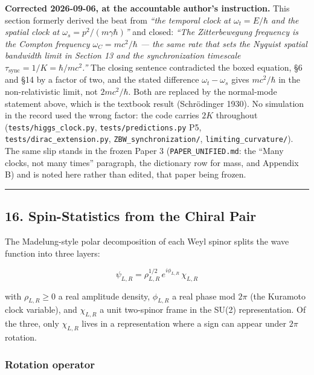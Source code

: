 \documentclass[
]{article}
\begin{document}
\textbf{Corrected 2026-09-06, at the accountable author's instruction.}
This section formerly derived the beat from \emph{``the temporal clock
at \(\omega_t = E/\hbar\) and the spatial clock at
\(\omega_s = p^2/(m\gamma\hbar)\)''} and closed: \emph{``The
Zitterbewegung frequency is the Compton frequency
\(\omega_C = mc^2/\hbar\) --- the same rate that sets the Nyquist
spatial bandwidth limit in Section 13 and the synchronization timescale
\(\tau_{\text{sync}} = 1/K = \hbar/mc^2\).''} The closing sentence
contradicted the boxed equation, §6 and §14 by a factor of two, and the
stated difference \(\omega_t - \omega_s\) gives \(mc^2/\hbar\) in the
non-relativistic limit, not \(2mc^2/\hbar\). Both are replaced by the
normal-mode statement above, which is the textbook result (Schrödinger
1930). No simulation in the record used the wrong factor: the code
carries \(2K\) throughout (\texttt{tests/higgs\_clock.py},
\texttt{tests/predictions.py} P5, \texttt{tests/dirac\_extension.py},
\texttt{ZBW\_synchronization/}, \texttt{limiting\_curvature/}). The same
slip stands in the frozen Paper 3 (\texttt{PAPER\_UNIFIED.md}: the
``Many clocks, not many times'' paragraph, the dictionary row for mass,
and Appendix B) and is noted here rather than edited, that paper being
frozen.

\begin{center}\rule{0.5\linewidth}{0.5pt}\end{center}

\subsection{16. Spin-Statistics from the Chiral
Pair}\label{spin-statistics-from-the-chiral-pair}

The Madelung-style polar decomposition of each Weyl spinor splits the
wave function into three layers:

\[\boxed{\psi_{L,R} = \rho_{L,R}^{1/2}\, e^{i\phi_{L,R}}\, \chi_{L,R}}\]

with \(\rho_{L,R} \geq 0\) a real amplitude density, \(\phi_{L,R}\) a
real phase mod \(2\pi\) (the Kuramoto clock variable), and
\(\chi_{L,R}\) a unit two-spinor frame in the SU(2) representation. Of
the three, only \(\chi_{L,R}\) lives in a representation where a sign
can appear under \(2\pi\) rotation.

\subsubsection{Rotation operator}\label{rotation-operator}
\end{document}

